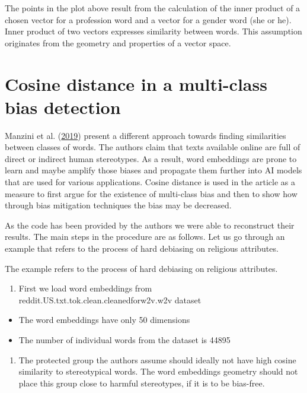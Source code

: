 \documentclass[12pt,]{book}
\providecommand{\tightlist}{%
  \setlength{\itemsep}{0pt}\setlength{\parskip}{0pt}}
\begin{document}
\normalsize

The points in the plot above result from the calculation of the inner
product of a chosen vector for a profession word and a vector for a
gender word (she or he). Inner product of two vectors expresses
similarity between words. This assumption originates from the geometry
and properties of a vector space.

\section{Cosine distance in a multi-class bias
detection}\label{cosine-distance-in-a-multi-class-bias-detection}

Manzini et al. (\protect\hyperlink{ref-manzini2019black}{2019}) present
a different approach towards finding similarities between classes of
words. The authors claim that texts available online are full of direct
or indirect human stereotypes. As a result, word embeddings are prone to
learn and maybe amplify those biases and propagate them further into AI
models that are used for various applications. Cosine distance is used
in the article as a measure to first argue for the existence of
multi-class bias and then to show how through bias mitigation techniques
the bias may be decreased.

As the code has been provided by the authors we were able to reconstruct
their results. The main steps in the procedure are as follows. Let us go
through an example that refers to the process of hard debiasing on
religious attributes.

The example refers to the process of hard debiasing on religious
attributes.

\begin{enumerate}
\def\labelenumi{\arabic{enumi}.}
\tightlist
\item
  First we load word embeddings from
  reddit.US.txt.tok.clean.cleanedforw2v.w2v dataset
\end{enumerate}

\begin{itemize}
\tightlist
\item
  The word embeddings have only 50 dimensions
\item
  The number of individual words from the dataset is 44895
\end{itemize}

\begin{enumerate}
\def\labelenumi{\arabic{enumi}.}
\setcounter{enumi}{1}
\tightlist
\item
  The protected group the authors assume should ideally not have high
  cosine similarity to stereotypical words. The word embeddings geometry
  should not place this group close to harmful stereotypes, if it is to
  be bias-free. \newline
\end{enumerate}
\end{document}
